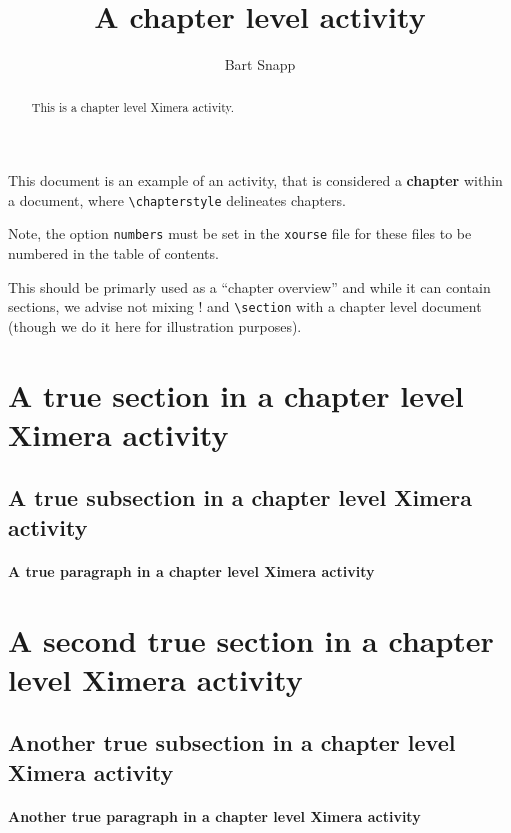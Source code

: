 \documentclass{ximera}
\author{Bart Snapp}
\title{A chapter level activity}
\begin{document}
\begin{abstract}
This is a chapter level Ximera activity.
\end{abstract}
\maketitle

This document is an example of an activity, that is considered a
\textbf{chapter} within a document, where \verb!\chapterstyle! delineates
chapters.

Note, the option \verb!numbers! must be set in the \verb!xourse! file for these
files to be numbered in the table of contents.

This should be primarly used as a ``chapter overview'' and while it can contain
sections, we advise not mixing \verb!!\sectionstyle! and \verb!\section! with a
chapter level document (though we do it here for illustration purposes).

\section{A true section in a chapter level Ximera activity}
\lipsum[1]

\subsection{A true subsection in a chapter level Ximera activity}
\lipsum[1]

\paragraph{A true paragraph in a chapter level Ximera activity}
\lipsum[1]

\section{A second true section in a chapter level Ximera activity}
\lipsum[1]

\subsection{Another true subsection in a chapter level Ximera activity}
\lipsum[1]

\paragraph{Another true paragraph in a chapter level Ximera activity}
\lipsum[1]
\end{document}
